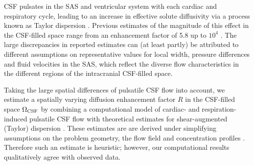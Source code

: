 



CSF pulsates in the SAS and ventricular system with each cardiac and respiratory cycle, leading to an increase in effective solute diffusivity via a process known as Taylor dispersion \cite{taylor1953dispersion, watson1983diffusion}. Previous estimates of the magnitude of this effect in the CSF-filled space range from an enhancement factor of 5.8 \cite{keith2019dispersion} up to $10^4$ \cite{ray2021quantitative}. The large discrepancies in reported estimates can (at least partly) be attributed to different assumptions on representative values for local width, pressure differences and fluid velocities in the SAS, which reflect the diverse flow characteristics in the different regions of the intracranial CSF-filled space.

Taking the large spatial differences of pulsatile CSF flow into account, we estimate a spatially varying diffusion enhancement factor $R$ in the CSF-filled space $\Omega_{\rm CSF}$ by combining a computational model of cardiac- and respiration-induced pulsatile CSF flow with theoretical estimates for shear-augmented (Taylor) dispersion \cite{taylor1953dispersion, watson1983diffusion}. These estimates are are derived under simplifying assumptions on the problem geometry, the flow field and concentration profiles \cite{watson1983diffusion, keith2019dispersion}. Therefore such an estimate is heuristic; however, our computational results qualitatively agree with observed data. 

